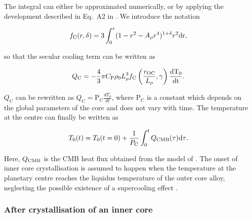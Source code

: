 \documentclass[draft]{agujournal2019} %
\begin{document}
The integral can either be approximated numerically, or by applying the development described in Eq.~A2 in . We introduce the notation 
\begin{linenomath*}
\begin{equation}
f_{\mathrm{C}}(r,\delta) = 3\int_{\mathrm{0}}^r(1-r^2-A_{\mathrm{\rho}} r^4)^{1+\delta}r^2 \rm{d}r, 
\end{equation}
\end{linenomath*}
so that the secular cooling term can be written as 
\begin{linenomath*}
\begin{equation}
Q_{\rm C} =  - \frac{4}{3} \pi C_{\mathrm{P}}\rho_{\mathrm{0}} L_{\mathrm{\rho}} ^3 f_{\mathrm{C}}\left ( \frac{r_{\mathrm{OC}}}{L_{\mathrm{\rho}}},\gamma\right)\frac{\rm{d}T_{\rm 0}}{\rm{d}t}.
\end{equation}
\end{linenomath*}

$Q_{\mathrm{C}}$ can be rewritten as $Q_{\mathrm{C}}=\mathrm{P}_{\mathrm{C}} \frac{d T_{\mathrm{0}}}{d t}$, where $\mathrm{P}_{\mathrm{C}}$ is a constant which depends on the global parameters of the core and does not vary with time. The temperature at the centre can finally be written as
\begin{linenomath*}
\begin{equation}
T_{\mathrm{0}}(t) = T_{\mathrm{0}}(t=0)+\frac{1}{P_{\mathrm{C}}}\int_0 ^t Q_{\mathrm{CMB}}(\tau)\rm{d\tau}.
\end{equation}
\end{linenomath*}

Here, $Q_{\rm CMB}$ is the CMB heat flux obtained from the model of . The onset of inner core crystallisation is assumed to happen when the temperature at the planetary centre reaches the liquidus temperature of the outer core alloy, neglecting the possible existence of a supercooling effect \cite{huguet2018earth}.

\subsubsection{After crystallisation of an inner core}
\end{document}
